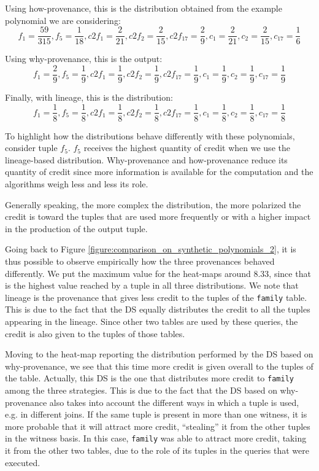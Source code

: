 Using how-provenance, this is the distribution obtained from the example polynomial we are considering:
{\footnotesize
\[
f_1 = \frac{59}{315}, f_5 = \frac{1}{18}, c2f_1 = \frac{2}{21}, c2f_2 = \frac{2}{15}, 
c2f_{17}=\frac{2}{9} , c_1 = \frac{2}{21}, c_2 = \frac{2}{15}, c_{17} = \frac{1}{6} 
\]
}

Using why-provenance, this is the output:
{\footnotesize
\[
f_1 = \frac{2}{9}, f_5 = \frac{1}{9}, c2f_1 = \frac{1}{9}, c2f_2 = \frac{1}{9}, 
c2f_{17}=\frac{1}{9} , c_1 = \frac{1}{9}, c_2 = \frac{1}{9}, c_{17} = \frac{1}{9} 
\]
}


Finally, with lineage, this is the distribution:
{\footnotesize
\[
f_1 = \frac{1}{8}, f_5 = \frac{1}{8}, c2f_1 = \frac{1}{8}, c2f_2 = \frac{1}{8}, 
c2f_{17}=\frac{1}{8} , c_1 = \frac{1}{8}, c_2 = \frac{1}{8}, c_{17} = \frac{1}{8} 
\]
}

To highlight how the distributions behave differently with these polynomials, consider tuple $f_5$.
$f_5$ receives the highest quantity of credit when we use the lineage-based distribution. Why-provenance and how-provenance reduce its quantity of credit since more information is available for the computation and the algorithms weigh less and less its role. 

Generally speaking, the more complex the distribution, the more polarized the credit is toward the tuples that are used more frequently or with a higher impact in the production of the output tuple. 

Going back to Figure \ref{figure:comparison_on_synthetic_polynomials_2}, it is thus possible to observe empirically how the three provenances behaved differently. We put the maximum value for the heat-maps around $8.33$, since that is the highest value reached by a tuple in all three distributions. 
We note that lineage is the provenance that gives less credit to the tuples of the \texttt{family} table. This is due to the fact that the DS equally distributes the credit to all the tuples appearing in the lineage. Since other two tables are used by these queries, the credit is also given to the tuples of those tables. 

Moving to the heat-map reporting the distribution performed by the DS based on why-provenance, we see that this time more credit is given overall to the tuples of the table. Actually, this DS is the one that distributes more credit to \texttt{family} among the three strategies. 
This is due to the fact that the DS based on why-provenance also takes into account the different ways in which a tuple is used, e.g. in different joins. If the same tuple is present in more than one witness, it is more probable that it will attract more credit, ``stealing'' it from the other tuples in the witness basis. In this case, \texttt{family} was able to attract more credit, taking it from the other two tables, due to the role of its tuples in the queries that were executed.

